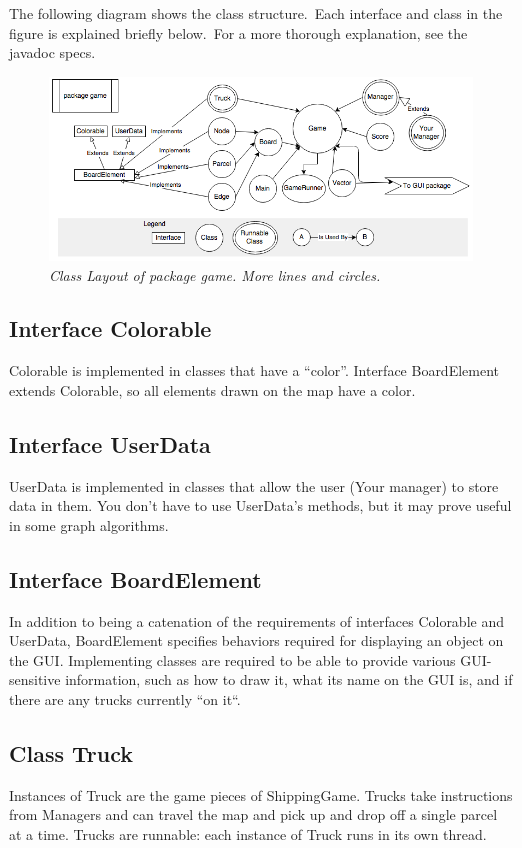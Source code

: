 \documentclass[11pt]{article}
\begin{document}
\begin{itemize}
The following diagram shows the class structure.\ Each interface and class in the figure is explained briefly below.\ For a more thorough explanation, see the javadoc specs.
\begin{figure}[h]
\centerline{\includegraphics[scale=0.5]{hirearchy.png}} 
\caption{\em{Class Layout of package game. More lines and circles.}}
\end{figure}
\subsection{Interface Colorable}
Colorable  is implemented in classes that have a ``color''. Interface BoardElement extends Colorable, so  all elements drawn on the map have a color.
\subsection{Interface UserData}
UserData is implemented in classes that allow the user (Your manager) to store data in them. You don't have to use UserData's methods, but it may prove useful in some graph algorithms.
\subsection{Interface BoardElement}
In addition to being a catenation of the requirements of interfaces Colorable and UserData, BoardElement specifies behaviors required for displaying an object on the GUI. Implementing classes are required to be able to provide various GUI-sensitive information, such as how to draw it, what its name on the GUI is, and if there are any trucks currently ``on it``.
\subsection{Class Truck}
Instances of Truck are the game pieces of ShippingGame. Trucks take instructions from Managers and can travel the map and pick up and drop off a single parcel at a time. Trucks are runnable: each instance of Truck runs in its own thread.

\end{itemize}
\end{document}
